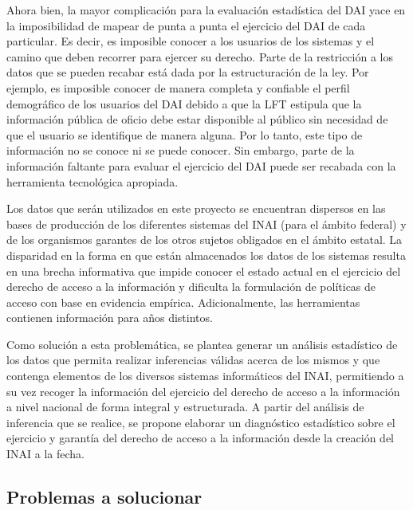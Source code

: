 Ahora bien, la mayor complicación para la evaluación estadística del DAI yace en la imposibilidad de mapear de punta a punta el ejercicio del DAI de cada particular. Es decir, es imposible conocer a los usuarios de los sistemas y el camino que deben recorrer para ejercer su derecho. Parte de la restricción a los datos que se pueden recabar está dada por la estructuración de la ley. Por ejemplo, es imposible conocer de manera completa y confiable el perfil demográfico de los usuarios del DAI debido a que la LFT estipula que la información pública de oficio debe estar disponible al público sin necesidad de que el usuario se identifique de manera alguna. Por lo tanto, este tipo de información no se conoce ni se puede conocer. Sin embargo, parte de la información faltante para evaluar el ejercicio del DAI puede ser recabada con la herramienta tecnológica apropiada.

Los datos que serán utilizados en este proyecto se encuentran dispersos en las bases de producción de los diferentes sistemas del INAI (para el ámbito federal) y de los organismos garantes de los otros sujetos obligados en el ámbito estatal. La disparidad en la forma en que están almacenados los datos de los sistemas resulta en una brecha informativa que impide conocer el estado actual en el ejercicio del derecho de acceso a la información y dificulta la formulación de políticas de acceso con base en evidencia empírica. Adicionalmente, las herramientas contienen información para años distintos. 

Como solución a esta problemática, se plantea generar un análisis estadístico de los datos que permita realizar inferencias válidas acerca de los mismos y que contenga elementos de los diversos sistemas informáticos del INAI, permitiendo a su vez recoger la información del ejercicio del derecho de acceso a la información a nivel nacional de forma integral y estructurada. A partir del análisis de inferencia que se realice, se propone elaborar un diagnóstico estadístico sobre el ejercicio y garantía del derecho de acceso a la información desde la creación del INAI a la fecha.   


\subsection{Problemas a solucionar}

